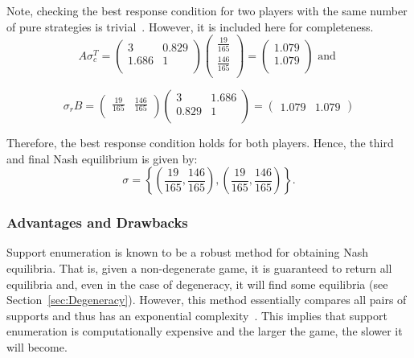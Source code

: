 Note, checking the best response condition for two players with the same number
of pure strategies is trivial~\cite{Knight2019b}. However, it is included here for completeness.
\begin{displaymath}
    A\sigma_{c}^{T} = \begin{pmatrix}
        3 & 0.829 \\
        1.686 & 1 \\
    \end{pmatrix} \begin{pmatrix}
        \frac{19}{165} \\
        \frac{146}{165} \\
    \end{pmatrix} = \begin{pmatrix}
        1.079 \\
        1.079 \\
    \end{pmatrix} \text{   and   }
\end{displaymath}

\begin{displaymath}
    \sigma_{r}B = \begin{pmatrix}
        \frac{19}{165} & \frac{146}{165} \\
    \end{pmatrix} \begin{pmatrix}
        3 & 1.686 \\
        0.829 & 1 \\
    \end{pmatrix} = \begin{pmatrix}
        1.079 & 1.079
    \end{pmatrix}
\end{displaymath}

Therefore, the best response condition holds for both players. Hence, the third and final Nash equilibrium is given by:
\begin{displaymath}
    \sigma = \left \{ (\frac{19}{165}, \frac{146}{165}), (\frac{19}{165}, \frac{146}{165})\right \}.
\end{displaymath}


\subsubsection{Advantages and Drawbacks}\label{subsubsec:Adv_and_Drawbacks}
Support enumeration is known to be a robust method for obtaining Nash
equilibria. That is, given a non-degenerate game,
it is guaranteed to return all equilibria and, even in the case of degeneracy,
it will find some equilibria (see Section~\ref{sec:Degeneracy}). However, this method essentially
compares all pairs of supports and thus has an exponential complexity~\cite{Rampersaud2014}. This implies that support enumeration is
computationally expensive and the larger the game, the slower it will become.



